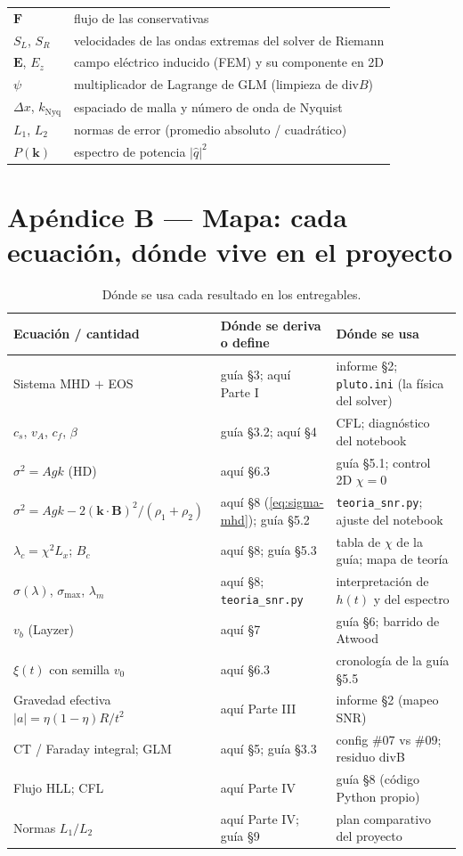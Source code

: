 \documentclass[11pt,a4paper]{article}
\newcommand{\B}{\mathbf{B}}
\newcommand{\code}[1]{\texttt{#1}}
\begin{document}
\begin{table}[H]
\begin{tabular}{@{}lp{11.6cm}@{}}
$\mathbf{F}$ & flujo de las conservativas \\
$S_L$, $S_R$ & velocidades de las ondas extremas del solver de Riemann \\
$\mathbf{E}$, $E_z$ & campo eléctrico inducido (FEM) y su componente en 2D \\
$\psi$ & multiplicador de Lagrange de GLM (limpieza de div$B$) \\
$\Delta x$, $k_\mathrm{Nyq}$ & espaciado de malla y número de onda de Nyquist \\
$L_1$, $L_2$ & normas de error (promedio absoluto / cuadrático) \\
$P(\mathbf{k})$ & espectro de potencia $|\hat{q}|^2$ \\
\bottomrule
\end{tabular}
\end{table}

\section{Apéndice B --- Mapa: cada ecuación, dónde vive en el proyecto}

\begin{table}[H]
\centering\small
\caption{Dónde se usa cada resultado en los entregables.}
\begin{tabular}{@{}p{6.2cm}p{4.2cm}p{4.8cm}@{}}
\toprule
Ecuación / cantidad & Dónde se deriva o define & Dónde se usa \\
\midrule
Sistema MHD $+$ EOS & guía \S3; aquí Parte I & informe \S2; \code{pluto.ini} (la física del solver) \\
$c_s$, $v_A$, $c_f$, $\beta$ & guía \S3.2; aquí \S4 & CFL; diagnóstico del notebook \\
$\sigma^2=Agk$ (HD) & aquí \S6.3 & guía \S5.1; control 2D $\chi=0$ \\
$\sigma^2=Agk-2(\mathbf{k}\cdot\B)^2/(\rho_1+\rho_2)$ & aquí \S8 (\ref{eq:sigma-mhd}); guía \S5.2 & \code{teoria\_snr.py}; ajuste del notebook \\
$\lambda_c=\chi^2L_x$; $B_c$ & aquí \S8; guía \S5.3 & tabla de $\chi$ de la guía; mapa de teoría \\
$\sigma(\lambda)$, $\sigma_\mathrm{max}$, $\lambda_m$ & aquí \S8; \code{teoria\_snr.py} & interpretación de $h(t)$ y del espectro \\
$v_b$ (Layzer) & aquí \S7 & guía \S6; barrido de Atwood \\
$\xi(t)$ con semilla $v_0$ & aquí \S6.3 & cronología de la guía \S5.5 \\
Gravedad efectiva $|a|=\eta(1-\eta)R/t^2$ & aquí Parte III & informe \S2 (mapeo SNR) \\
CT / Faraday integral; GLM & aquí \S5; guía \S3.3 & config \#07 vs \#09; residuo divB \\
Flujo HLL; CFL & aquí Parte IV & guía \S8 (código Python propio) \\
Normas $L_1/L_2$ & aquí Parte IV; guía \S9 & plan comparativo del proyecto \\
\bottomrule
\end{tabular}
\end{table}
\end{document}
